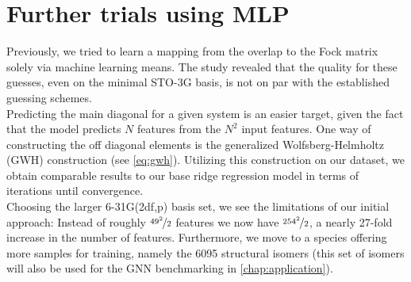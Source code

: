 \section{Further trials using MLP}
\label{sec:further_trials_mlp}
Previously, we tried to learn a mapping from the overlap to the Fock matrix solely via machine learning means. The study revealed that the quality for these guesses, even on the minimal STO-3G basis, is not on par with the established guessing schemes.\\
Predicting the main diagonal for a given system is an easier target, given the fact that the model predicts $N$ features from the $N^2$ input features. One way of constructing the off diagonal elements is the generalized Wolfsberg-Helmholtz (GWH) construction \parencite{ref:gwh_wolfsberg1952spectra} (see \autoref{eq:gwh}).
Utilizing this construction on our dataset, we obtain comparable results to our base ridge regression model in terms of iterations until convergence. \\
Choosing the larger 6-31G(2df,p) basis set, we see the limitations of our initial approach: Instead of roughly $\nicefrac{49^2}{2}$ features we now have $\nicefrac{254^2}{2}$, a nearly 27-fold increase in the number of features. Furthermore, we move to a species offering more samples for training, namely the 6095  structural isomers (this set of isomers will also be used for the GNN benchmarking in \autoref{chap:application}).

